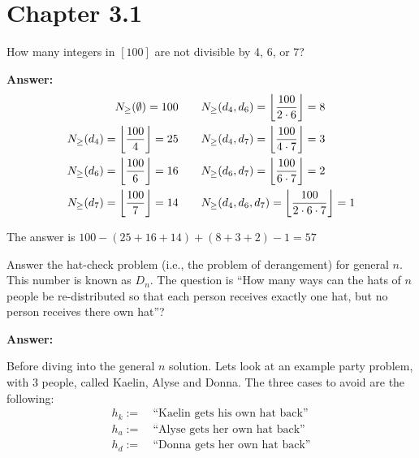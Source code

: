 \documentclass{article}
\begin{document}
\section{Chapter 3.1}
\setcounter{problem}{1}
\begin{problem} %
How many integers in $[100]$ are not divisible by 4, 6, or 7?
\end{problem}

\textbf{Answer:}
\begin{align*}
    N_{\ge}(\emptyset) = 100 \quad \quad & N_{\ge}(d_4, d_6) = \left\lfloor \dfrac{100}{2 \cdot 6} \right\rfloor = 8 \\
    N_{\ge}(d_4) = \left\lfloor \dfrac{100}{4} \right\rfloor = 25 \quad \quad & N_{\ge}(d_4, d_7) = \left\lfloor \dfrac{100}{4 \cdot 7} \right\rfloor = 3 \\
    N_{\ge}(d_6) = \left\lfloor \dfrac{100}{6} \right\rfloor = 16 \quad \quad & N_{\ge}(d_6, d_7) = \left\lfloor \dfrac{100}{6 \cdot 7} \right\rfloor = 2 \\
    N_{\ge}(d_7) = \left\lfloor \dfrac{100}{7} \right\rfloor = 14 \quad \quad & N_{\ge}(d_4, d_6, d_7) = \left\lfloor \dfrac{100}{2 \cdot 6 \cdot 7} \right\rfloor = 1
\end{align*}

The answer is $100 - (25+16+14) + (8 + 3 + 2) - 1 = 57$

\setcounter{problem}{5}
\begin{problem} %
    Answer the hat-check problem (i.e., the problem of derangement) for general $n$. This number is known as $D_n$. The question is ``How many ways can the hats of $n$ people be re-distributed so that each person receives exactly one hat, but no person receives there own hat''?
\end{problem}

\textbf{Answer:}

Before diving into the general $n$ solution. Lets look at an example party problem, with 3 people, called Kaelin, Alyse and Donna. The three cases to avoid are the following:
\begin{align*}
    h_k := & \: \text{``Kaelin gets his own hat back''} \\
    h_a := & \: \text{``Alyse gets her own hat back''} \\
    h_d := & \: \text{``Donna gets her own hat back''}
\end{align*}
\end{document}
